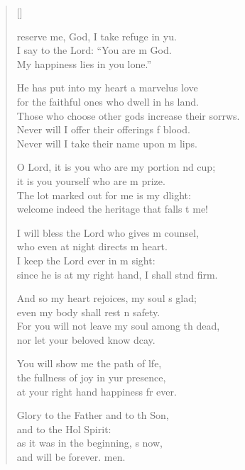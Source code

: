 \settowidth{\versewidth}{Those who choose other gods increase their sorrows. +}
\begin{verse}[\versewidth]
  \begin{patverse}
reserve me, God, I take refuge in yu.\Flex\\
I say to the Lord: “You are m God.\Med\\
My happiness lies in you lone.”

He has put into my heart a marvelus love\Med\\
for the faithful ones who dwell in h\pointup{\i}s land.\\
Those who choose other gods increase their sorrws.\Flex\\
Never will I offer their offerings f blood.\Med\\
Never will I take their name upon m lips.

O Lord, it is you who are my portion nd cup;\Med\\
it is you yourself who are m prize.\\
The lot marked out for me is my dlight:\Med\\
welcome indeed the heritage that falls t me!

I will bless the Lord who gives m counsel,\Med\\
who even at night directs m heart.\\
I keep the Lord ever in m sight:\Med\\
since he is at my right hand, I shall stnd firm.

And so my heart rejoices, my soul \pointup{\i}s glad;\Med\\
even my body shall rest \pointup{\i}n safety.\\
For you will not leave my soul among th dead,\Med\\
nor let your beloved know dcay.

You will show me the path of l\pointup{\i}fe,\Flex\\
the fullness of joy in yur presence,\Med\\
at your right hand happiness fr ever.

Glory to the Father and to th Son,\Med\\
and to the Hol Spirit:\\
as it was in the beginning, \pointup{\i}s now,\Med\\
and will be forever. men. 
  \end{patverse}
\end{verse}
